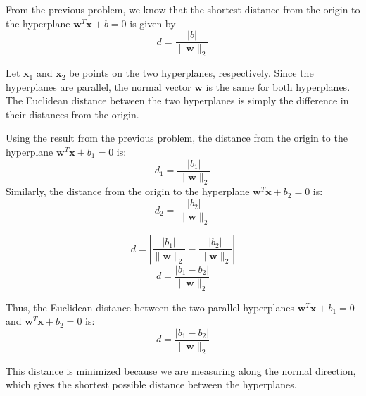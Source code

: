 \documentclass[letter]{article}
\theoremstyle{definition}
\newenvironment{soln}{
	\leavevmode\color{black}\ignorespaces
}{}
\begin{document}
\begin{enumerate}
            \begin{soln}
            From the previous problem, we know that the shortest distance from the origin to the hyperplane $\mathbf{w}^{T} \mathbf{x} + b = 0$ is given by 
            \[
            d = \frac{|b|}{\|\mathbf{w}\|_2}
            \]
            
            
            Let $\mathbf{x}_1$ and $\mathbf{x}_2$ be points on the two hyperplanes, respectively. Since the hyperplanes are parallel, the normal vector $\mathbf{w}$ is the same for both hyperplanes. The Euclidean distance between the two hyperplanes is simply the difference in their distances from the origin.
            
            Using the result from the previous problem, the distance from the origin to the hyperplane $\mathbf{w}^{T} \mathbf{x} + b_1 = 0$ is:
            \[
            d_1 = \frac{|b_1|}{\|\mathbf{w}\|_2}
            \]
            Similarly, the distance from the origin to the hyperplane $\mathbf{w}^{T} \mathbf{x} + b_2 = 0$ is:
            \[
            d_2 = \frac{|b_2|}{\|\mathbf{w}\|_2}
            \]
            
            \[
            d = \left| \frac{|b_1|}{\|\mathbf{w}\|_2} - \frac{|b_2|}{\|\mathbf{w}\|_2} \right|
            \]
            \[
            d = \frac{|b_1 - b_2|}{\|\mathbf{w}\|_2}
            \]
            
            Thus, the Euclidean distance between the two parallel hyperplanes $\mathbf{w}^T \mathbf{x} + b_1 = 0$ and $\mathbf{w}^T \mathbf{x} + b_2 = 0$ is:
            \[
            d = \frac{|b_1 - b_2|}{\|\mathbf{w}\|_2}
            \]
            
            This distance is minimized because we are measuring along the normal direction, which gives the shortest possible distance between the hyperplanes.
            \end{soln}
  
               
        



\end{enumerate}
\end{document}
